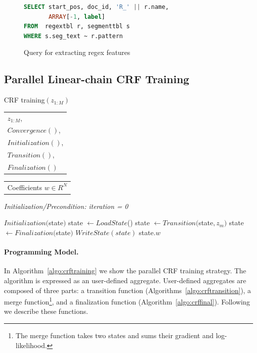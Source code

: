 \documentclass[11pt,letterpaper]{article}
\newlength{\alglabelwidth}
\newcommand{\alginput}[1]{%
\par\noindent%
\settowidth{\alglabelwidth}{\emph{Output:}}%
\makebox[\alglabelwidth][l]{\emph{Input:}} \begin{tabular}[t]{l} #1 \end{tabular}}
\newcommand{\algoutput}[1]{%
\par\noindent%
\settowidth{\alglabelwidth}{\emph{Output:}}%
\makebox[\alglabelwidth][l]{\emph{Output:}} \begin{tabular}[t]{l} #1 \end{tabular}}
\newcommand{\algprecond}[1]{%
\par\noindent\textit{Initialization/Precondition: #1}}
\begin{document}
\begin{figure}
\centering
\begin{lstlisting}[language=SQL, breaklines=true]
SELECT start_pos, doc_id, 'R_' || r.name, 
       ARRAY[-1, label]
FROM  regextbl r, segmenttbl s
WHERE s.seg_text ~ r.pattern
\end{lstlisting}
\caption{Query for extracting regex features}
\label{fig:regexfeatures}
\end{figure}



\subsection{Parallel Linear-chain CRF Training}
\begin{algorithm} 
\caption{CRF training$(z_{1:M})$} \label{alg:CRF training}
\alginput{$z_{1:M}$, \Comment{Document set}\\
$\mathit{Convergence}()$, \\
$\mathit{Initialization}()$,\\
$\mathit{Transition}()$,\\
$\mathit{Finalization}()$}
\algoutput{Coefficients $w \in R^N$}
\algprecond{iteration = 0}
\begin{algorithmic}[1]
\State $\mathit{Initialization}($state$)$ \label{algo:line:traininit}
\Repeat
				\State state $\gets \mathit{LoadState}$() \label{algo:line:trainload}
 \label{algo:line:trainmap} 
\State state $\gets \mathit{Transition}($state$, z_m)$
\EndFor
\State state $ \gets Finalization($state$)$ \label{algo:line:trainreduce} %
\State $\mathit{WriteState(state)}$ \label{algo:line:trainsave}
    \State \Return state$.{w}$ 
\end{algorithmic}
\label{algo:crftraining}
\end{algorithm}

\paragraph{Programming Model.}
In Algorithm~\ref{algo:crftraining} we show the parallel CRF training strategy.
The algorithm is expressed as an user-defined aggregate.
User-defined aggregates are composed of three parts: a transition function (Algorithms~\ref{algo:crftransition}), 
a merge function\footnote{The merge function takes two states and sums their gradient and log-likelihood.},
and a finalization function (Algorithm~\ref{algo:crffinal}).
Following we describe these functions.
\end{document}

